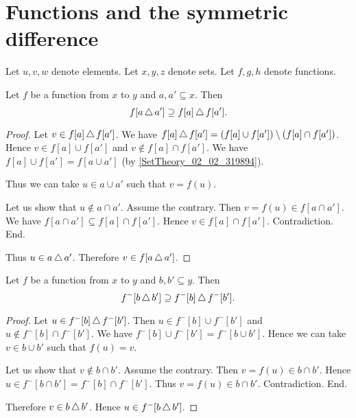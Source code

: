 \documentclass[../../set-theory.ftl.tex]{subfiles}
\begin{document}
  \section{Functions and the symmetric difference}

  \begin{forthel}
  \end{forthel}

  \begin{forthel}
  \end{forthel}

  \begin{forthel}
  Let $u,v,w$ denote elements.
  Let $x,y,z$ denote sets.
  Let $f,g,h$ denote functions.
  \end{forthel}


  \begin{forthel}
    \begin{proposition}\label{SetTheory_02_04_657921}
      Let $f$ be a function from $x$ to $y$ and $a,a' \subseteq x$.
      Then \[ f[a \mathop{\triangle} a'] \supseteq f[a] \mathop{\triangle} f[a']. \]
    \end{proposition}
    \begin{proof}
      Let $v \in f[a] \mathop{\triangle} f[a']$.
      We have $f[a] \mathop{\triangle} f[a'] = (f[a] \cup f[a']) \setminus (f[a] \cap f[a'])$.
      Hence $v \in f[a] \cup f[a']$ and $v \notin f[a] \cap f[a']$.
      We have $f[a] \cup f[a'] = f[a \cup a']$ (by \ref{SetTheory_02_02_319894}).

      Thus we can take $u \in a \cup a'$ such that $v = f(u)$.

      Let us show that $u \notin a \cap a'$.
        Assume the contrary.
        Then $v = f(u) \in f[a \cap a']$.
        We have $f[a \cap a'] \subseteq f[a] \cap f[a']$.
        Hence $v \in f[a] \cap f[a']$.
        Contradiction.
      End.

      Thus $u \in a \mathop{\triangle} a'$.
      Therefore $v \in f[a \mathop{\triangle} a']$.
    \end{proof}


    \begin{proposition}\label{SetTheory_02_04_661750}
      Let $f$ be a function from $x$ to $y$ and $b,b' \subseteq y$.
      Then \[ f^{-}[b \mathop{\triangle} b'] \supseteq f^{-}[b] \mathop{\triangle} f^{-}[b']. \]
    \end{proposition}
    \begin{proof}
      Let $u \in f^{-}[b] \mathop{\triangle} f^{-}[b']$.
      Then $u \in f^{-}[b] \cup f^{-}[b']$ and $u \notin f^{-}[b] \cap f^{-}[b']$.
      We have $f^{-}[b] \cup f^{-}[b'] = f^{-}[b \cup b']$.
      Hence we can take $v \in b \cup b'$ such that $f(u) = v$.

      Let us show that $v \notin b \cap b'$.
        Assume the contrary.
        Then $v = f(u) \in b \cap b'$.
        Hence $u \in f^{-}[b \cap b'] = f^{-}[b] \cap f^{-}[b']$.
        Thus $v = f(u) \in b \cap b'$.
        Contradiction.
      End.

      Therefore $v \in b \mathop{\triangle} b'$.
      Hence $u \in f^{-}[b \mathop{\triangle} b']$.
    \end{proof}
  \end{forthel}
\end{document}
